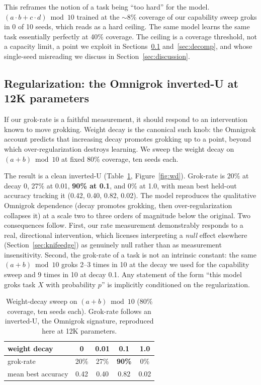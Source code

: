 \documentclass[10pt]{article} %
\begin{document}
This reframes the notion of a task being ``too hard'' for the model. $(a\cdot b + c\cdot d)\bmod 10$
trained at the $\sim$8\% coverage of our capability sweep groks in 0 of 10 seeds, which reads as a
hard ceiling. The same model learns the same task essentially perfectly at 40\% coverage. The
ceiling is a coverage threshold, not a capacity limit, a point we exploit in Sections~\ref{sec:wd}
and~\ref{sec:decomp}, and whose single-seed misreading we discuss in Section~\ref{sec:discussion}.

\subsection{Regularization: the Omnigrok inverted-U at 12K parameters}
\label{sec:wd}

If our grok-rate is a faithful measurement, it should respond to an intervention known to move
grokking. Weight decay is the canonical such knob: the Omnigrok account predicts that increasing
decay promotes grokking up to a point, beyond which over-regularization destroys learning. We
sweep the weight decay on $(a{+}b)\bmod 10$ at fixed 80\% coverage, ten seeds each.

The result is a clean inverted-U (Table~\ref{tab:wd}, Figure~\ref{fig:wd}). Grok-rate is 20\% at
decay 0, 27\% at 0.01, \textbf{90\% at 0.1}, and 0\% at 1.0, with mean best held-out accuracy
tracking it (0.42, 0.40, 0.82, 0.02). The model reproduces the qualitative Omnigrok dependence
(decay promotes grokking, then over-regularization collapses it) at a scale two to three orders of
magnitude below the original. Two consequences follow. First, our rate measurement demonstrably
responds to a real, directional intervention, which licenses interpreting a \emph{null} effect
elsewhere (Section~\ref{sec:knifeedge}) as genuinely null rather than as measurement
insensitivity. Second, the grok-rate of a task is not an intrinsic constant: the same
$(a{+}b)\bmod 10$ groks 2--3 times in 10 at the decay we used for the capability sweep and 9 times
in 10 at decay 0.1. Any statement of the form ``this model groks task $X$ with probability $p$'' is
implicitly conditioned on the regularization.

\begin{table}[t]
\caption{Weight-decay sweep on $(a{+}b)\bmod 10$ (80\% coverage, ten seeds each). Grok-rate
follows an inverted-U, the Omnigrok signature, reproduced here at 12K parameters.}
\label{tab:wd}
\begin{center}
\begin{tabular}{lcccc}
\toprule
weight decay & 0 & 0.01 & 0.1 & 1.0 \\
\midrule
grok-rate          & 20\% & 27\% & \textbf{90\%} & 0\% \\
mean best accuracy & 0.42 & 0.40 & 0.82 & 0.02 \\
\bottomrule
\end{tabular}
\end{center}
\end{table}
\end{document}
